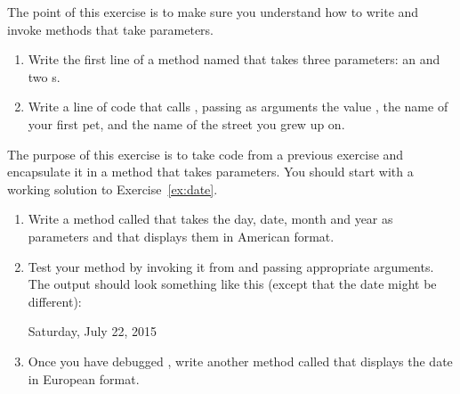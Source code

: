 




\begin{exercise}

The point of this exercise is to make sure you understand how to write and invoke methods that take parameters.

\begin{enumerate}
\item Write the first line of a method named  that takes three parameters: an  and two s.

\item Write a line of code that calls , passing as arguments the value , the name of your first pet, and the name of the street you grew up on.
\end{enumerate}

\end{exercise}


\begin{exercise}

The purpose of this exercise is to take code from a previous exercise and encapsulate it in a method that takes parameters.
You should start with a working solution to Exercise~\ref{ex:date}.

\begin{enumerate}

\item Write a method called  that takes the day, date, month and year as parameters and that displays them in American format.

\item Test your method by invoking it from  and passing appropriate arguments.
The output should look something like this (except that the date might be different):

\begin{stdout}
Saturday, July 22, 2015
\end{stdout}

\item Once you have debugged , write another method called  that displays the date in European format.

\end{enumerate}

\end{exercise}
